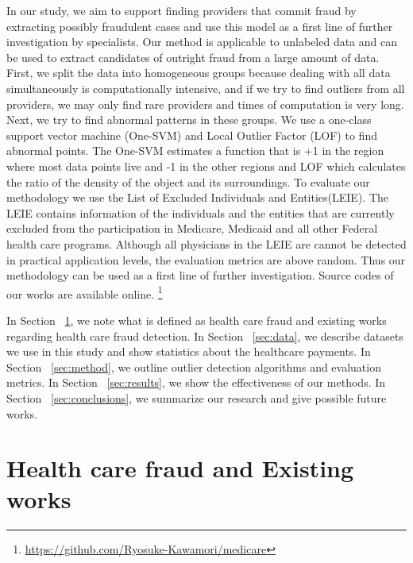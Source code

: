 \documentclass[dvipdfmx, english]{ampmt}             %
\newcommand{\Secref}[1]{Section ~\ref{#1}}
\begin{document}
\par
In our study, we aim to support finding providers that commit fraud by extracting possibly fraudulent cases and use this model as a first line of further investigation by specialists. Our method is applicable to unlabeled data and can be used to extract candidates of outright fraud from a large amount of data. First, we split the data into homogeneous groups because dealing with all data simultaneously is computationally intensive, and if we try to find outliers from all providers, we may only find rare providers and times of computation is very long. Next, we try to find abnormal patterns in these groups.
We use a one-class support vector machine (One-SVM) \cite{OneSVM} and Local Outlier Factor (LOF)\cite{Breunig} to find abnormal points. The One-SVM estimates a function that is +1 in the region where most data points live and -1 in the other regions and LOF which calculates the ratio of the density of the object and its surroundings. To evaluate our methodology we use the List of Excluded Individuals and Entities(LEIE)\cite{Leie}. The LEIE contains information of the individuals and the entities that are currently excluded from the participation in Medicare, Medicaid and all other Federal health care programs. Although all physicians in the LEIE are cannot be detected in practical application levels, the evaluation metrics are above random. Thus our methodology can be used as a first line of further investigation. Source codes of our works
are available online. \footnote{\url{https://github.com/Ryosuke-Kawamori/medicare}}
\par
In \Secref{sec:hcf-and-ex-works}, we note what is defined as health care fraud and existing works regarding health care fraud detection. In \Secref{sec:data}, we describe datasets we use in this study and show statistics about the healthcare payments. In \Secref{sec:method}, we outline outlier detection algorithms and evaluation metrics. In \Secref{sec:results}, we show the effectiveness of our methods. In \Secref{sec:conclusions}, we summarize our research and give possible future works.






\section{Health care fraud and Existing works}\label{sec:hcf-and-ex-works}
\end{document}
